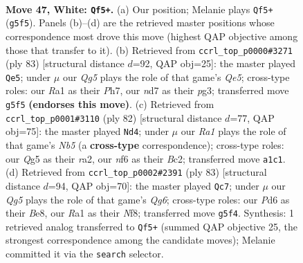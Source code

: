 \documentclass[11pt]{article}
\begin{document}
\clearpage

\begin{figure}[p]\centering
\begin{subfigure}{0.46\textwidth}\centering
\resizebox{\linewidth}{!}{%
\newchessgame
\chessboard[
  setfen={3q4/1b1n1p1k/3P1n2/2p3Q1/p6P/5pP1/PB6/R5K1 w - - 7 47},
  showmover=false,
  pgfstyle=straightmove, color=movearrow, markmove={g5-f5}
]}
\caption{}
\end{subfigure}\hfill
\begin{subfigure}{0.46\textwidth}\centering
\resizebox{\linewidth}{!}{%
\newchessgame
\chessboard[
  setfen={6k1/p6p/2p3p1/P7/4q2P/1PP1N1P1/3K1p2/3B1N2 b - - 5 42},
  showmover=false,
  pgfstyle=straightmove, color=movearrow, markmove={e4-e5}
]}
\caption{}
\end{subfigure}
\\[4pt]
\begin{subfigure}{0.46\textwidth}\centering
\resizebox{\linewidth}{!}{%
\newchessgame
\chessboard[
  setfen={6k1/3nqp2/5np1/1N1P2Q1/1Pp5/2P4P/r1B2RK1/8 w - - 5 42},
  showmover=false,
  pgfstyle=straightmove, color=movearrow, markmove={b5-d4}
]}
\caption{}
\end{subfigure}\hfill
\begin{subfigure}{0.46\textwidth}\centering
\resizebox{\linewidth}{!}{%
\newchessgame
\chessboard[
  setfen={4bn2/1p4pk/p7/P2Q3p/4P2P/2P2Nq1/6B1/6K1 b - - 6 42},
  showmover=false,
  pgfstyle=straightmove, color=movearrow, markmove={g3-c7}
]}
\caption{}
\end{subfigure}
\caption{\textbf{Move 47, White: \texttt{Qf5+}.} (a) Our position; Melanie plays \texttt{Qf5+} (\texttt{g5f5}). Panels (b)--(d) are the retrieved master positions whose correspondence most drove this move (highest QAP objective among those that transfer to it). (b) Retrieved from \texttt{ccrl\_top\_p0000\#3271} (ply 83) [structural distance $d$=92, QAP obj=25]: the master played \texttt{Qe5}; under $\mu$ our \emph{Qg5} plays the role of that game's \emph{Qe5}; cross-type roles: our \emph{R}a1 as their \emph{P}h7, our \emph{n}d7 as their \emph{p}g3; transferred move \texttt{g5f5} \textbf{(endorses this move)}. (c) Retrieved from \texttt{ccrl\_top\_p0001\#3110} (ply 82) [structural distance $d$=77, QAP obj=75]: the master played \texttt{Nd4}; under $\mu$ our \emph{Ra1} plays the role of that game's \emph{Nb5} (a \textbf{cross-type} correspondence); cross-type roles: our \emph{Q}g5 as their \emph{r}a2, our \emph{n}f6 as their \emph{B}c2; transferred move \texttt{a1c1}. (d) Retrieved from \texttt{ccrl\_top\_p0002\#2391} (ply 83) [structural distance $d$=94, QAP obj=70]: the master played \texttt{Qc7}; under $\mu$ our \emph{Qg5} plays the role of that game's \emph{Qg6}; cross-type roles: our \emph{P}d6 as their \emph{B}e8, our \emph{R}a1 as their \emph{N}f8; transferred move \texttt{g5f4}. Synthesis: 1 retrieved analog transferred to \texttt{Qf5+} (summed QAP objective 25, the strongest correspondence among the candidate moves); Melanie committed it via the \texttt{search} selector.}
\label{fig:thought-m92}
\end{figure}
\end{document}
